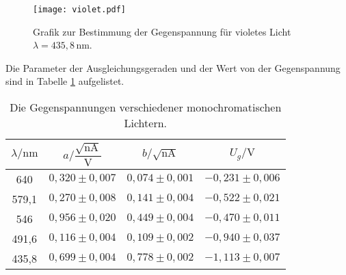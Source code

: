   \begin{figure}[H]
    \centering
    \texttt{[image: violet.pdf]}
    \caption{Grafik zur Bestimmung der Gegenspannung für violetes Licht $ \lambda = 435,8\,\text{nm}$.}
    \label{fig:violetes}
  \end{figure}
  \noindent
Die Parameter  der Ausgleichungsgeraden und der Wert von der Gegenspannung sind  in Tabelle \ref{tab:Gegenspannung} aufgelistet.
\begin{table}[H]
  \centering
  \caption{Die Gegenspannungen verschiedener monochromatischen Lichtern.}
  \label{tab:Gegenspannung}
  \begin{tabular}{| c |c|c|  c |}
  \toprule
   $\lambda/\mathrm{nm}$ & $a/\mathrm{\dfrac{\sqrt{nA}}{V}}$  &  $b/\mathrm{\sqrt{nA}}$& $U_g/\mathrm{V}$  \\
   \midrule
   640& $0,320 \pm 0,007 $&$0,074\pm 0,001$&      $  -0,231 \pm 0,006 $\\
   579,1& $0,270 \pm 0,008$& $0,141\pm 0,004$&    $  -0,522 \pm 0,021 $\\
   546&$0,956 \pm 0,020 $ & $0,449 \pm 0,004$ &   $ -0,470 \pm  0,011 $\\
   491,6&$0,116 \pm 0,004 $ & $0,109 \pm 0,002$ & $-0,940 \pm   0,037 $\\
   435,8& $0,699 \pm 0,004 $ & $0,778 \pm 0,002$& $-1,113\pm    0,007 $\\

  \bottomrule
  \end{tabular}
\end{table}


